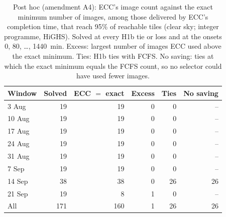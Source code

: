 \begin{table}[H]
\centering
\footnotesize
\renewcommand{\arraystretch}{1.2}
\setlength{\tabcolsep}{3.5pt}
\caption{Post hoc (amendment A4): ECC's image count against the exact minimum number of images, among
those delivered by ECC's completion time, that reach 95\% of reachable tiles (clear sky; integer programme,
HiGHS). Solved at every H1b tie or loss and at the onsets 0, 80, \dots, 1440~min. Excess: largest
number of images ECC used above the exact minimum. Ties: H1b ties with FCFS. No saving: ties at which the
exact minimum equals the FCFS count, so no selector could have used fewer images.}
\label{tab:a4_exact_economy}
\begin{tabular}{|l|r|r|r|r|r|}
\hline
Window & Solved & ECC $=$ exact & Excess & Ties & No saving \\
\hline
3 Aug & 19 & 19 & 0 & 0 & -- \\
\hline
10 Aug & 19 & 19 & 0 & 0 & -- \\
\hline
17 Aug & 19 & 19 & 0 & 0 & -- \\
\hline
24 Aug & 19 & 19 & 0 & 0 & -- \\
\hline
31 Aug & 19 & 19 & 0 & 0 & -- \\
\hline
7 Sep & 19 & 19 & 0 & 0 & -- \\
\hline
14 Sep & 38 & 38 & 0 & 26 & 26 \\
\hline
21 Sep & 19 & 8 & 1 & 0 & -- \\
\hline
All & 171 & 160 & 1 & 26 & 26 \\
\hline
\end{tabular}
\end{table}
